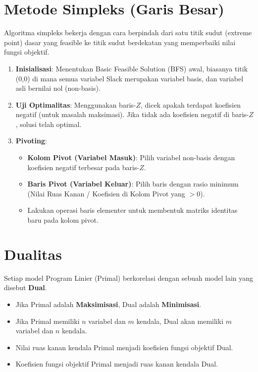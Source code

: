 \documentclass[11pt, a4paper]{article}
\begin{document}
\section{Metode Simpleks (Garis Besar)}
Algoritma simpleks bekerja dengan cara berpindah dari satu titik sudut (extreme point) dasar yang feasible ke titik sudut berdekatan yang memperbaiki nilai fungsi objektif.
\begin{enumerate}
    \item \textbf{Inisialisasi}: Menentukan Basic Feasible Solution (BFS) awal, biasanya titik (0,0) di mana semua variabel Slack merupakan variabel basis, dan variabel asli bernilai nol (non-basis).
    \item \textbf{Uji Optimalitas}: Menggunakan baris-$Z$, dicek apakah terdapat koefisien negatif (untuk masalah maksimasi). Jika tidak ada koefisien negatif di baris-$Z$, solusi telah optimal.
    \item \textbf{Pivoting}:
    \begin{itemize}
        \item \textbf{Kolom Pivot (Variabel Masuk)}: Pilih variabel non-basis dengan koefisien negatif terbesar pada baris-$Z$.
        \item \textbf{Baris Pivot (Variabel Keluar)}: Pilih baris dengan rasio minimum (Nilai Ruas Kanan / Koefisien di Kolom Pivot yang $>0$).
        \item Lakukan operasi baris elementer untuk membentuk matriks identitas baru pada kolom pivot.
    \end{itemize}
\end{enumerate}

\section{Dualitas}
Setiap model Program Linier (Primal) berkorelasi dengan sebuah model lain yang disebut \textbf{Dual}.

\begin{tcolorbox}[colback=blue!5,colframe=UNIBBlue,title=Aturan Primal-Dual Dasar]
\begin{itemize}
    \item Jika Primal adalah \textbf{Maksimisasi}, Dual adalah \textbf{Minimisasi}.
    \item Jika Primal memiliki $n$ variabel dan $m$ kendala, Dual akan memiliki $m$ variabel dan $n$ kendala.
    \item Nilai ruas kanan kendala Primal menjadi koefisien fungsi objektif Dual.
    \item Koefisien fungsi objektif Primal menjadi ruas kanan kendala Dual.
\end{itemize}
\end{tcolorbox}
\end{document}
